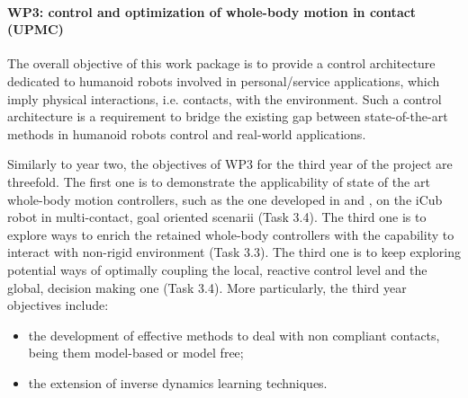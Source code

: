 \paragraph{WP3: control and optimization of whole-body motion in contact (UPMC)}

The overall objective of this work package is to provide a control architecture dedicated to humanoid robots involved in personal/service applications, which imply physical interactions, i.e. contacts, with the environment. Such a control architecture is a requirement to bridge the existing gap between state-of-the-art methods in humanoid robots control and real-world applications.

Similarly to year two, the objectives of WP3 for the third year of the project are threefold. The first one is to demonstrate the applicability of state of the art whole-body motion controllers, such as the one developed in \cite{salini2012} and \cite{delprete2013}, on the iCub robot in multi-contact, goal oriented scenarii (Task 3.4). The third one is to explore ways to enrich the retained whole-body controllers with the capability to interact with non-rigid environment (Task 3.3). The third one is to keep exploring potential ways of optimally coupling the local, reactive control level and the global, decision making one (Task 3.4). More particularly, the third year objectives include:
\begin{itemize}
\item the development of effective methods to deal with non compliant contacts, being them model-based or model free;
\item the extension of inverse dynamics learning techniques.
\end{itemize}
